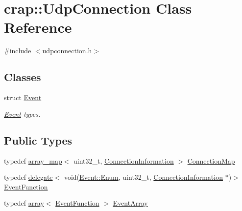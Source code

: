 \hypertarget{classcrap_1_1_udp_connection}{}\section{crap\+:\+:Udp\+Connection Class Reference}
\label{classcrap_1_1_udp_connection}


{\ttfamily \#include $<$udpconnection.\+h$>$}

\subsection*{Classes}
\begin{DoxyCompactItemize}
\item 
struct \hyperlink{structcrap_1_1_udp_connection_1_1_event}{Event}
\begin{DoxyCompactList}\small\item\em \hyperlink{structcrap_1_1_udp_connection_1_1_event}{Event} types. \end{DoxyCompactList}\end{DoxyCompactItemize}
\subsection*{Public Types}
\begin{DoxyCompactItemize}
\item 
typedef \hyperlink{classcrap_1_1array__map}{array\+\_\+map}$<$ uint32\+\_\+t, \hyperlink{structcrap_1_1_connection_information}{Connection\+Information} $>$ \hyperlink{classcrap_1_1_udp_connection_a2182c50061f2f64c874b4e74a4de64e9}{Connection\+Map}
\item 
typedef \hyperlink{classcrap_1_1delegate}{delegate}$<$ void(\hyperlink{structcrap_1_1_udp_connection_1_1_event_adcb4025fc6cb1f099dd37b511c96bb15}{Event\+::\+Enum}, uint32\+\_\+t, \hyperlink{structcrap_1_1_connection_information}{Connection\+Information} $\ast$)$>$ \hyperlink{classcrap_1_1_udp_connection_afd162aa96fdbc4cada668fda39a34bf7}{Event\+Function}
\item 
typedef \hyperlink{classcrap_1_1array}{array}$<$ \hyperlink{classcrap_1_1_udp_connection_afd162aa96fdbc4cada668fda39a34bf7}{Event\+Function} $>$ \hyperlink{classcrap_1_1_udp_connection_a19d68a5229c759dd795467a73fec47fd}{Event\+Array}
\end{DoxyCompactItemize}
